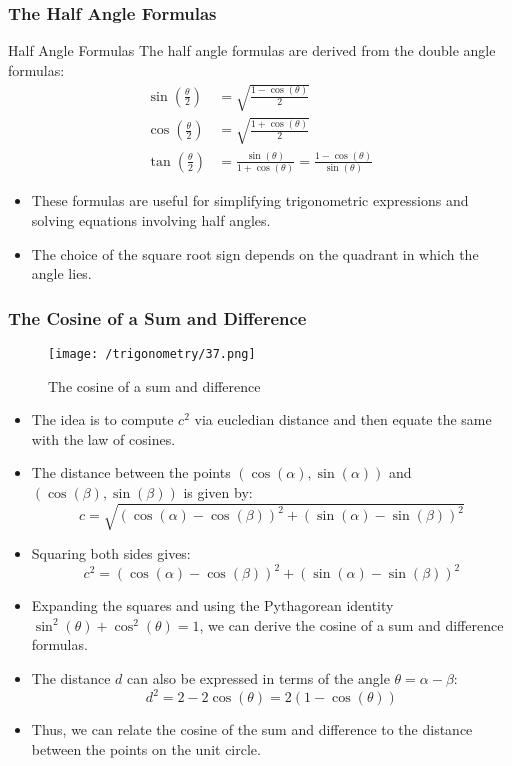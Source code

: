 \documentclass{beamer}
\begin{document}
\begin{frame}
    \frametitle{The Half Angle Formulas}
    \begin{block}{Half Angle Formulas}
        The half angle formulas are derived from the double angle formulas:
        \begin{align}
            \sin\left(\frac{\theta}{2}\right) &= \sqrt{\frac{1 - \cos(\theta)}{2}} \\
            \cos\left(\frac{\theta}{2}\right) &= \sqrt{\frac{1 + \cos(\theta)}{2}} \\
            \tan\left(\frac{\theta}{2}\right) &= \frac{\sin(\theta)}{1 + \cos(\theta)} = \frac{1 - \cos(\theta)}{\sin(\theta)}
        \end{align}
    \end{block}
    \begin{itemize}
        \item These formulas are useful for simplifying trigonometric expressions and solving equations involving half angles.
        \item The choice of the square root sign depends on the quadrant in which the angle lies.
    \end{itemize}
\end{frame}

\begin{frame}
    \frametitle{The Cosine of a Sum and Difference}
    \begin{figure}
        \centering
        \texttt{[image: /trigonometry/37.png]}
        \caption{The cosine of a sum and difference}
    \end{figure}
\end{frame} 

\begin{frame}
    \begin{itemize}
        \item The idea is to compute \(c^2\) via eucledian distance and then equate the same with the law of cosines.
        \item The distance between the points \((\cos(\alpha), \sin(\alpha))\) and \((\cos(\beta), \sin(\beta))\) is given by:
        \[
        c = \sqrt{(\cos(\alpha) - \cos(\beta))^2 + (\sin(\alpha) - \sin(\beta))^2}
        \]
        \item Squaring both sides gives:
        \[
        c^2 = (\cos(\alpha) - \cos(\beta))^2 + (\sin(\alpha) - \sin(\beta))^2
        \]
        \item Expanding the squares and using the Pythagorean identity \(\sin^2(\theta) + \cos^2(\theta) = 1\), we can derive the cosine of a sum and difference formulas.
        \item The distance \(d\) can also be expressed in terms of the angle \(\theta = \alpha - \beta\):
        \[
        d^2 = 2 - 2\cos(\theta) = 2(1 - \cos(\theta))
        \]
        \item Thus, we can relate the cosine of the sum and difference to the distance between the points on the unit circle.               
    \end{itemize}
\end{frame}
\end{document}
